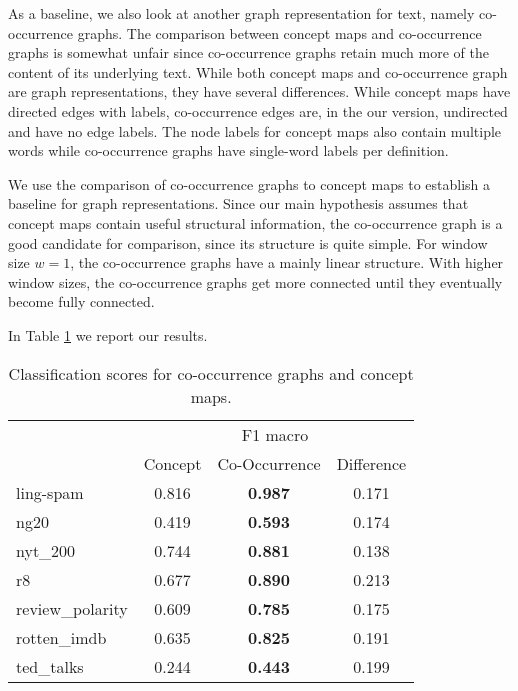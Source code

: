 As a baseline, we also look at another graph representation for text, namely co-occurrence graphs.
The comparison between concept maps and co-occurrence graphs is somewhat unfair since co-occurrence graphs retain much more of the content of its underlying text.
While both concept maps and co-occurrence graph are graph representations, they have several differences. While concept maps have directed edges with labels, co-occurrence edges are, in the our version, undirected and have no edge labels.
The node labels for concept maps also contain multiple words while co-occurrence graphs have single-word labels per definition.

We use the comparison of co-occurrence graphs to concept maps to establish a baseline for graph representations.
Since our main hypothesis assumes that concept maps contain useful structural information, the co-occurrence graph is a good candidate for comparison, since its structure is quite simple.
For window size $w=1$, the co-occurrence graphs have a mainly linear structure. With higher window sizes, the co-occurrence graphs get more connected until they eventually become fully connected.

In Table \ref{table:comparison_results_cooccurrence} we report our results.


\begin{table}[htb!]
    \centering
    \begin{tabular}{lcc|c}
    \toprule
        {} &  \multicolumn{3}{c}{F1 macro} \\
        & Concept &  Co-Occurrence & Difference \\
        \midrule
            ling-spam       & 0.816 & \textbf{0.987} & 0.171 \\
            ng20            & 0.419 & \textbf{0.593} & 0.174 \\
            nyt\_200         & 0.744 &\textbf{0.881 }& 0.138 \\
            r8              & 0.677 &\textbf{0.890} & 0.213 \\
            review\_polarity & 0.609 & \textbf{0.785} & 0.175 \\
            rotten\_imdb     & 0.635 & \textbf{0.825} & 0.191 \\
            ted\_talks       & 0.244 & \textbf{0.443} & 0.199 \\
        \bottomrule
    \end{tabular}
    \caption[Results: Co-Occurrence vs. Concept Maps]{Classification scores for co-occurrence graphs and concept maps.}\label{table:comparison_results_cooccurrence}
\end{table}


